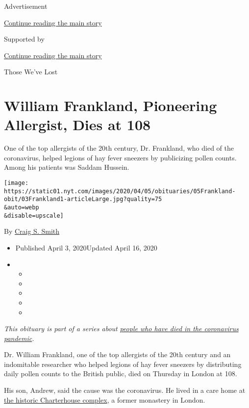 Advertisement

\protect\hyperlink{after-top}{Continue reading the main story}

Supported by

\protect\hyperlink{after-sponsor}{Continue reading the main story}

Those We've Lost

\hypertarget{william-frankland-pioneering-allergist-dies-at-108}{%
\section{William Frankland, Pioneering Allergist, Dies at
108}\label{william-frankland-pioneering-allergist-dies-at-108}}

One of the top allergists of the 20th century, Dr. Frankland, who died
of the coronavirus, helped legions of hay fever sneezers by publicizing
pollen counts. Among his patients was Saddam Hussein.

\texttt{[image: https://static01.nyt.com/images/2020/04/05/obituaries/05Frankland-obit/03Frankland1-articleLarge.jpg?quality=75\\\&auto=webp\\\&disable=upscale]}

By \href{https://www.nytimes.com/by/craig-s-smith}{Craig S. Smith}

\begin{itemize}
\item
  Published April 3, 2020Updated April 16, 2020
\item
  \begin{itemize}
  \item
  \item
  \item
  \item
  \item
  \end{itemize}
\end{itemize}

\emph{This obituary is part of a series about}
\href{https://www.nytimes.com/series/people-who-have-died-of-the-coronavirus}{\emph{people
who have died in the coronavirus pandemic}}\emph{.}

Dr. William Frankland, one of the top allergists of the 20th century and
an indomitable researcher who helped legions of hay fever sneezers by
distributing daily pollen counts to the British public, died on Thursday
in London at 108.

His son, Andrew, said the cause was the coronavirus. He lived in a care
home at \href{http://www.thecharterhouse.org/news/}{the historic
Charterhouse complex}, a former monastery in London.

